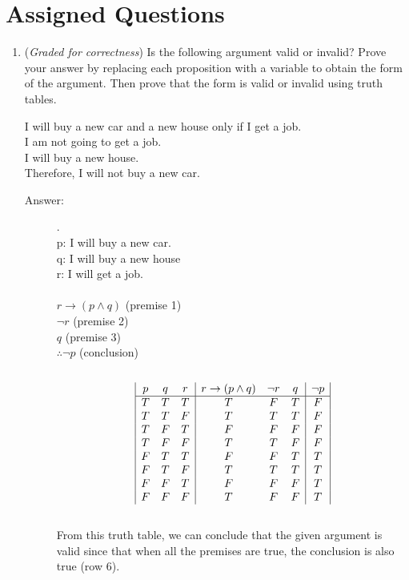 \documentclass[12pt, oneside]{article}
\begin{document}
\newpage
\section*{Assigned Questions}

\begin{enumerate}

\item ({\it Graded for correctness}) Is the following argument valid or invalid? Prove your answer by replacing each proposition with a variable to obtain the form of the argument. Then prove that the form is valid or invalid using truth tables. 

I will buy a new car and a new house only if I get a job.\\
I am not going to get a job.\\
I will buy a new house.\\
Therefore, I will not buy a new car.

\begin{description}
    \item[Answer:] .\\
    p: I will buy a new car.\\
    q: I will buy a new house\\
    r: I will get a job.\\\\

    $r \rightarrow (p \land q)$ (premise 1)\\
    $\lnot r$ (premise 2)\\
    $q$ (premise 3)\\
    $\therefore \lnot p$ (conclusion)\\\\
    \begin{displaymath}
        \begin{array}{|c c c|c c c|c|}
        p & q & r & r \rightarrow (p \land q) & \lnot r & q & \lnot p\\
        \hline
        T & T & T & T & F & T & F\\
        T & T & F & T & T & T & F\\
        T & F & T & F & F & F & F\\
        T & F & F & T & T & F & F\\
        F & T & T & F & F & T & T\\
        F & T & F & T & T & T & T\\
        F & F & T & F & F & F & T\\
        F & F & F & T & F & F & T\\
        \end{array}
    \end{displaymath}\\
    From this truth table, we can conclude that the given argument is valid since that when all the premises are true, the conclusion is also true (row 6).
\end{description}



\end{enumerate}
\end{document}
